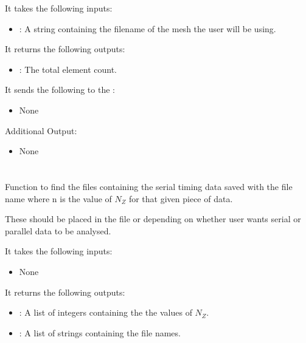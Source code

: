 It takes the following inputs:

\begin{itemize}
\item {}: A string containing the filename of the mesh the user will be using.
\end{itemize}

It returns the following outputs:

\begin{itemize}
\item {}: The total element count.
\end{itemize}

It sends the following to the :

\begin{itemize}
\item None
\end{itemize}

Additional Output:
\begin{itemize}
\item None
\end{itemize}


\section{}
Function to find the  files containing the serial timing data saved with the file name  where n is the value of \(N_Z\) for that given piece of data. 

These should be placed in the file  or  depending on whether user wants serial or parallel data to be analysed. 

It takes the following inputs:

\begin{itemize}
\item None
\end{itemize}

It returns the following outputs:

\begin{itemize}
\item {}: A list of integers containing the the values of \(N_Z\).
\item {}: A list of strings containing the file names.
\end{itemize}

